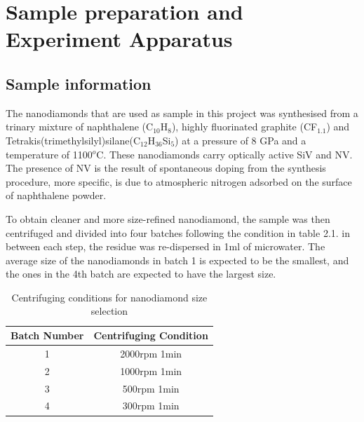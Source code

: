 \chapter[Sample preparation and Experiment Apparatus]{Sample preparation and Experiment Apparatus} %

\label{Chapter2} %

\section{Sample information}
The nanodiamonds that are used as sample in this project was synthesised from a trinary mixture of naphthalene (C$_{10}$H$_{8}$), highly fluorinated graphite (CF$_{1.1}$) and Tetrakis(trimethylsilyl)silane(C$_{12}$H$_{36}$Si$_{5}$) at a pressure of 8 GPa and a temperature of 1100$^{o}$C. These nanodiamonds carry optically active SiV and NV. The presence of NV is the result of spontaneous doping from the synthesis procedure, more specific, is due to atmospheric nitrogen adsorbed on the surface of naphthalene powder.\citep{davydov_production_2014}

To obtain cleaner and more size-refined nanodiamond, the sample was then centrifuged and divided into four batches following the condition in table 2.1. in between each step, the residue was re-dispersed in 1ml of microwater. The average size of the nanodiamonds in batch 1 is expected to be the smallest, and the ones in the 4th batch are expected to have the largest size.
\begin {table}[]
\caption {Centrifuging conditions for nanodiamond size selection} \label{tab:title} 
\begin{center}
\begin{tabular}{|c|c|}	
	\hline 
	Batch Number & Centrifuging Condition \\ 
	\hline 
	1 & 2000rpm 1min \\ 
	\hline 
	2 & 1000rpm 1min \\ 
	\hline 
	3 & 500rpm 1min \\ 
	\hline 
	4 & 300rpm 1min \\ 
	\hline 
\end{tabular} 
\end{center}
\end{table}
